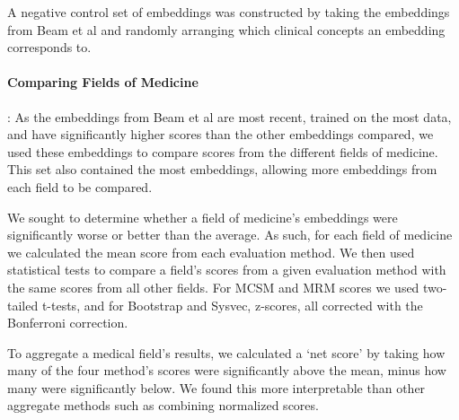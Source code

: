 \documentclass[11pt,a4paper]{article}
\begin{document}
A negative control set of embeddings was constructed by taking the embeddings from Beam et al  and randomly arranging which clinical concepts an embedding corresponds to. 

\paragraph{Comparing Fields of Medicine}: As the embeddings from Beam et al  are most recent, trained on the most data, and have significantly higher scores than the other embeddings compared, we used these embeddings to compare scores from the different fields of medicine. This set also contained the most embeddings, allowing more embeddings from each field to be compared. 

We sought to determine whether a field of medicine's embeddings were significantly worse or better than the average. As such, for each field of medicine we calculated the mean score from each evaluation method. We then used statistical tests to compare a field's scores from a given evaluation method with the same scores from all other fields. For MCSM and MRM scores we used two-tailed t-tests, and for Bootstrap and Sysvec, z-scores, all corrected with the Bonferroni correction. 

To aggregate a medical field's results, we calculated a `net score' by taking how many of the four method's scores were significantly above the mean, minus how many were significantly below. We found this more interpretable than other aggregate methods such as combining normalized scores. 
\end{document}
